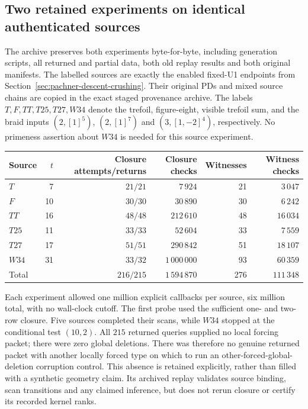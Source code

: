 \subsection{Two retained experiments on identical authenticated sources}

The archive  preserves both
experiments byte-for-byte, including generation scripts, all returned
and partial data, both old replay results and both original manifests.
The labelled sources are exactly the enabled fixed-U1 endpoints from
Section~\ref{sec:pachner-descent-crushing}.  Their original PDs and
mixed source chains are copied in the exact staged provenance archive.
The labels $T,F,TT,T25,T27,W34$ denote the trefoil, figure-eight, visible
trefoil sum, and the braid inputs $(2,[1]^5)$, $(2,[1]^7)$ and
$(3,[1,-2]^4)$, respectively.  No primeness assertion about $W34$ is
needed for this source experiment.

\begin{center}
\begin{tabular}{lrrrrr}
Source & $t$ & Closure attempts/returns & Closure checks & Witnesses & Witness checks\\
\hline
$T$   & 7  & $21/21$ & $7\,924$       & 21 & $3\,047$\\
$F$   & 10 & $30/30$ & $30\,890$      & 30 & $6\,242$\\
$TT$  & 16 & $48/48$ & $212\,610$     & 48 & $16\,034$\\
$T25$ & 11 & $33/33$ & $52\,604$      & 33 & $7\,559$\\
$T27$ & 17 & $51/51$ & $290\,842$     & 51 & $18\,107$\\
$W34$ & 31 & $33/32$ & $1\,000\,000$ & 93 & $60\,359$\\
\hline
Total &    & $216/215$ & $1\,594\,870$ & 276 & $111\,348$
\end{tabular}
\end{center}

Each experiment allowed one million explicit callbacks per source,
six million total, with no wall-clock cutoff.  The first probe used
the sufficient one- and two-row closure.  Five sources completed
their scans, while $W34$ stopped at the conditional test $(10,2)$.
All $215$ returned queries supplied no local forcing packet; there
were zero global deletions.  There was therefore no genuine returned
packet with another locally forced type on which to run an
other-forced-global-deletion corruption control.  This absence is
retained explicitly, rather than filled with a synthetic geometry
claim.  Its archived replay validates source binding, scan transitions
and any claimed inference, but does not rerun closure or certify its
recorded kernel ranks.


